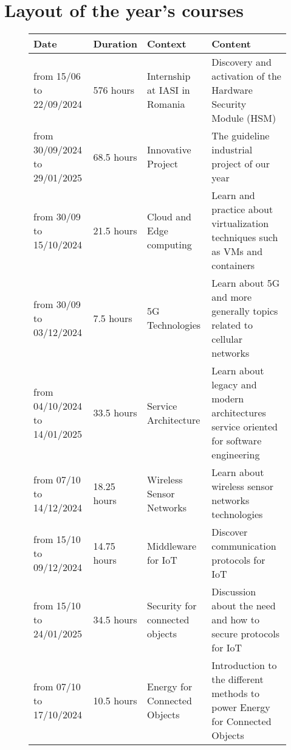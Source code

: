 \section{Layout of the year's courses}
\begin{figure}[H]
    \centering
    \begin{tabular}{|C{2cm}|C{2cm}|C{4cm}|C{6cm}|}
        \hline
        \textbf{Date} & \textbf{Duration} & \textbf{Context} & \textbf{Content} \\
        \hline
        from 15/06 to 22/09/2024 & 576 hours & Internship at IASI in Romania &  Discovery and activation of the Hardware Security Module (HSM) \\
        \hline
        from 30/09/2024 to 29/01/2025 & 68.5 hours & Innovative Project & The guideline industrial project of our year \\
        \hline
        from 30/09 to 15/10/2024 & 21.5 hours & Cloud and Edge computing & Learn and practice about virtualization techniques such as VMs and containers \\
        \hline
        from 30/09 to 03/12/2024 & 7.5 hours & 5G Technologies & Learn about 5G and more generally topics related to cellular networks \\
        \hline
        from 04/10/2024 to 14/01/2025 & 33.5 hours & Service Architecture & Learn about legacy and modern architectures service oriented for software engineering \\
        \hline
        from 07/10 to 14/12/2024 & 18.25 hours & Wireless Sensor Networks & Learn about wireless sensor networks technologies \\
        \hline
        from 15/10 to 09/12/2024 & 14.75 hours & Middleware for IoT & Discover communication protocols for IoT \\
        \hline
        from 15/10 to 24/01/2025 & 34.5 hours & Security for connected objects & Discussion about the need and how to secure protocols for IoT \\
        \hline
        from 07/10 to 17/10/2024 & 10.5 hours & Energy for Connected Objects & Introduction to the different methods to power Energy for Connected Objects \\
        \hline
        
    \end{tabular}
\end{figure}


